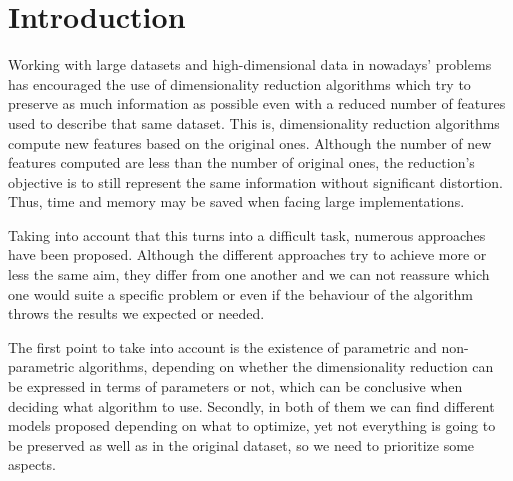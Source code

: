 \documentclass[a4paper,11pt,spanish]{report}
\newcommand{\linespacing}{1.5}
\renewcommand{\baselinestretch}{\linespacing}
\begin{document}
\renewcommand{\baselinestretch}{\linespacing}
\small\normalsize

\newpage
{}
\tableofcontents
\listoftables
{}
{}
\listoffigures
{}
{}

\newpage
{}


\chapter{Introduction}
\label{chap:intro}

Working with large datasets and high-dimensional data in nowadays' problems has encouraged the use of dimensionality reduction algorithms which try to preserve as much information as possible even with a reduced number of features used to describe that same dataset. This is, dimensionality reduction algorithms compute new features based on the original ones. Although the number of new features computed are less than the number of original ones, the reduction's objective is to still represent the same information without significant distortion. Thus, time and memory may be saved when facing large implementations.

Taking into account that this turns into a difficult task, numerous approaches have been proposed.
Although the different approaches try to achieve more or less the same aim, they differ from one another and we can not reassure which one would suite a specific problem or even if the behaviour of the algorithm throws the results we expected or needed.

The first point to take into account is the existence of parametric and non-parametric algorithms, depending on whether the dimensionality reduction can be expressed in terms of parameters or not, which can be conclusive when deciding what algorithm to use. Secondly, in both of them we can find different models proposed depending on what to optimize, yet not everything is going to be preserved as well as in the original dataset, so we need to prioritize some aspects.
\end{document}
